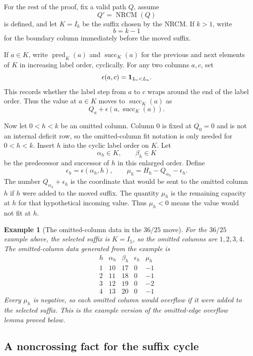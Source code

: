 \documentclass[10pt]{article}
\newtheorem{example}{Example}
\newcommand{\NRCM}{\operatorname{NRCM}}
\begin{document}
For the rest of the proof, fix a valid path \(Q\), assume
\[
  Q'=\NRCM(Q)
\]
is defined, and let \(K=I_k\) be the suffix chosen by the NRCM.  If \(k>1\),
write
\[
  b=k-1
\]
for the boundary column immediately before the moved suffix.

If \(a\in K\), write \(\operatorname{pred}_K(a)\) and
\(\operatorname{succ}_K(a)\) for the previous and next elements of \(K\) in
increasing label order, cyclically.  For any two columns \(a,c\), set
\[
  \epsilon(a,c)={\bf 1}_{L_c<L_a}.
\]
This records whether the label step from \(a\) to \(c\) wraps around the end
of the label order.  Thus the value at \(a\in K\) moves to
\(\operatorname{succ}_K(a)\) as
\[
  Q_a+\epsilon(a,\operatorname{succ}_K(a)).
\]

Now let \(0<h<k\) be an omitted column.  Column \(0\) is fixed at \(Q_0=0\)
and is not an internal deficit row, so the omitted-column fit notation is only
needed for \(0<h<k\).  Insert \(h\) into the cyclic label order on \(K\).  Let
\[
  \alpha_h\in K,\qquad \beta_h\in K
\]
be the predecessor and successor of \(h\) in this enlarged order.  Define
\[
  \epsilon_h=\epsilon(\alpha_h,h),
  \qquad
  \mu_h=H_h-Q_{\alpha_h}-\epsilon_h.
\]
The number \(Q_{\alpha_h}+\epsilon_h\) is the coordinate that would be sent to
the omitted column \(h\) if \(h\) were added to the moved suffix.  The
quantity \(\mu_h\) is the remaining capacity at \(h\) for that hypothetical
incoming value.  Thus \(\mu_h<0\) means the value would not fit at \(h\).

\begin{example}[The omitted-column data in the \(36/25\) move]
For the \(36/25\) example above, the selected suffix is \(K=I_5\), so the
omitted columns are \(1,2,3,4\).  The omitted-column data generated from the
example is
\[
\begin{array}{c|c|c|c|c}
h & \alpha_h & \beta_h & \epsilon_h & \mu_h\\ \hline
1 & 10 & 17 & 0 & -1\\
2 & 11 & 18 & 0 & -1\\
3 & 12 & 19 & 0 & -2\\
4 & 13 & 20 & 0 & -1
\end{array}
\]
Every \(\mu_h\) is negative, so each omitted column would overflow if it were
added to the selected suffix.  This is the example version of the omitted-edge
overflow lemma proved below.
\end{example}

\subsection*{A noncrossing fact for the suffix cycle}
\end{document}
